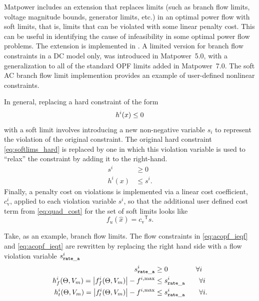 \documentclass[12pt]{article}
\newcommand{\matpower}[0]{{\sc Matpower}}
\newcommand{\code}[1]{{\relsize{-0.5}{\tt{{#1}}}}}  %
\newcommand{\trans}[1]{{#1}^{\ensuremath{\mathsf{T}}}}  %
\numberwithin{equation}{section}
\numberwithin{table}{section}
\numberwithin{figure}{section}
\begin{document}
\matpower{} includes an extension that replaces limits (such as branch flow limits, voltage magnitude bounds, generator limits, etc.)  in an optimal power flow with soft limits, that is, limits that can be violated with some linear penalty cost.
This can be useful in identifying the cause of infeasibility in some optimal power flow problems.
The extension is implemented in \code{toggle\_softlims}. A limited version for branch flow constraints in a DC model only, was introduced in \matpower{}~5.0, with a generalization to all of the standard OPF limits added in \matpower{}~7.0. The soft AC branch flow limit implemention provides an example of user-defined nonlinear constraints.

In general, replacing a hard constraint of the form
\begin{equation}
	h^i(x) \leq 0  \label{eq:softlims_hard} \\
\end{equation}
with a soft limit involves introducing a new non-negative variable $s_i$ to represent the violation of the original constraint. The original hard constraint \eqref{eq:softlims_hard} is replaced by one in which this violation variable is used to ``relax'' the constraint by adding it to the right-hand.
\begin{align}
	s^i &\geq 0  \label{eq:softlims_infbound} \\
	h^i(x) &\leq s^i.
\end{align}
Finally, a penalty cost on violations is implemented via a linear cost coefficient, $c_\mathrm{v}^i$, applied to each violation variable $s^i$, so that the additional user defined cost term from \eqref{eq:quad_cost} for the set of soft limits looks like
\begin{equation}
f_u(\hat{x}) = \trans{c_\mathrm{v}} s.
\label{eq:softlims_cost}
\end{equation}

Take, as an example, branch flow limits.
The flow constraints in \eqref{eq:acopf_ieqf} and \eqref{eq:acopf_ieqt} are rewritten by replacing the right hand side with a flow violation variable $s_{\tt{rate\_a}}^i$
\begin{align}
 s_{\tt{rate\_a}}^i &\ge 0 \qquad\qquad \forall{i}\\
h_f^i(\Theta, V_m) = \left| f_f^i(\Theta, V_m) \right| - f^{i,\mathrm{max}} &\le s_{\tt{rate\_a}}^i \qquad \forall{i} \\
h_t^i(\Theta, V_m) = \left| f_t^i(\Theta, V_m) \right| - f^{i,\mathrm{max}} &\le s_{\tt{rate\_a}}^i \qquad \forall{i}.
\end{align}
\end{document}
